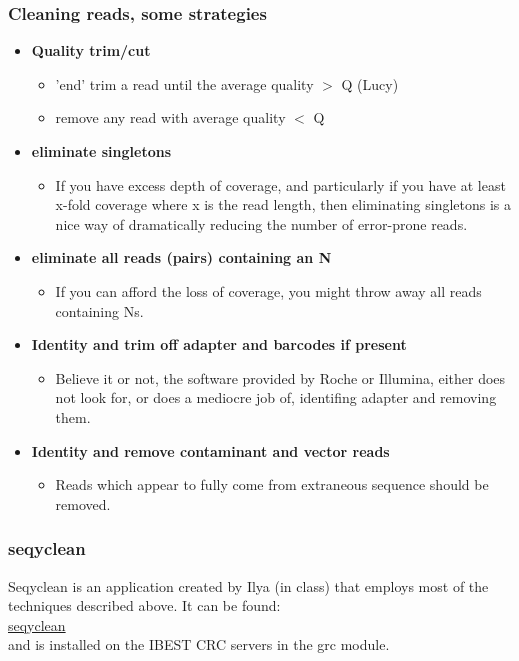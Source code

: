 \documentclass[pdf]{beamer}
\begin{document}
\begin{frame}[allowframebreaks]
\frametitle{Cleaning reads, some strategies}
\begin{itemize}
\item \textbf{Quality trim/cut}
\begin{itemize} 
\item 'end' trim a read until the average quality $>$ Q (Lucy)
\item remove any read with average quality $<$ Q
\end{itemize}
\item \textbf{eliminate singletons}
\begin{itemize}
\item If you have excess depth of coverage, and particularly if you have at least x-fold coverage where x is the read length, then eliminating singletons is a nice way of dramatically reducing the number of error-prone reads.
\end{itemize}
\item \textbf{eliminate all reads (pairs) containing an N}
\begin{itemize}
\item If you can afford the loss of coverage, you might throw away all reads containing Ns.
\end{itemize}
\item \textbf{Identity and trim off adapter and barcodes if present}
\begin{itemize}
\item Believe it or not, the software provided by Roche or Illumina, either does not look for, or does a mediocre job of, identifing adapter and removing them.
\end{itemize}
\item \textbf{Identity and remove contaminant and vector reads}
\begin{itemize}
\item Reads which appear to fully come from extraneous sequence should be removed.
\end{itemize}

\end{itemize}
\end{frame}

\begin{frame}
\frametitle{seqyclean}
Seqyclean is an application created by Ilya (in class) that employs most of the techniques described above. It can be found:\\
\vspace{0.2in}
\href{http://cores.ibest.uidaho.edu/software/seqyclean}{seqyclean}\\
\vspace{0.2in}
and is installed on the IBEST CRC servers in the grc module.
\end{frame}
\end{document}
